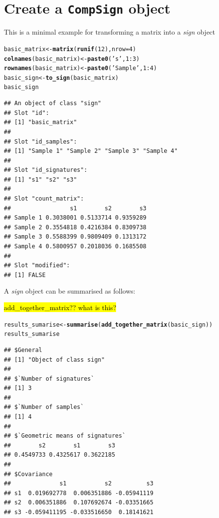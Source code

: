 \documentclass{article}\usepackage[]{graphicx}\usepackage[]{color}
\makeatletter
\newcommand{\hlnum}[1]{\textcolor[rgb]{0.686,0.059,0.569}{#1}}%
\newcommand{\hlstr}[1]{\textcolor[rgb]{0.192,0.494,0.8}{#1}}%
\newcommand{\hlopt}[1]{\textcolor[rgb]{0,0,0}{#1}}%
\newcommand{\hlstd}[1]{\textcolor[rgb]{0.345,0.345,0.345}{#1}}%
\newcommand{\hlkwb}[1]{\textcolor[rgb]{0.69,0.353,0.396}{#1}}%
\newcommand{\hlkwc}[1]{\textcolor[rgb]{0.333,0.667,0.333}{#1}}%
\newcommand{\hlkwd}[1]{\textcolor[rgb]{0.737,0.353,0.396}{\textbf{#1}}}%
\newenvironment{kframe}{%
 \def\at@end@of@kframe{}%
 \ifinner\ifhmode%
  \def\at@end@of@kframe{\end{minipage}}%
  \begin{minipage}{\columnwidth}%
 \fi\fi%
 \def\FrameCommand##1{\hskip\@totalleftmargin \hskip-\fboxsep
 \colorbox{shadecolor}{##1}\hskip-\fboxsep
     \hskip-\linewidth \hskip-\@totalleftmargin \hskip\columnwidth}%
 \MakeFramed {\advance\hsize-\width
   \@totalleftmargin\z@ \linewidth\hsize
   \@setminipage}}%
 {\par\unskip\endMakeFramed%
 \at@end@of@kframe}
\newenvironment{knitrout}{}{} %
\makeatother
\begin{document}
\section{Create a \texttt{CompSign} object}
This is a minimal example for transforming a matrix into a \emph{sign} object
\begin{knitrout}
\color{fgcolor}\begin{kframe}
\begin{alltt}
\hlstd{basic_matrix} \hlkwb{<-} \hlkwd{matrix}\hlstd{(}\hlkwd{runif}\hlstd{(}\hlnum{12}\hlstd{),} \hlkwc{nrow} \hlstd{=} \hlnum{4}\hlstd{)}
\hlkwd{colnames}\hlstd{(basic_matrix)} \hlkwb{<-} \hlkwd{paste0}\hlstd{(}\hlstr{'s'}\hlstd{,} \hlnum{1}\hlopt{:}\hlnum{3}\hlstd{)}
\hlkwd{rownames}\hlstd{(basic_matrix)} \hlkwb{<-} \hlkwd{paste0}\hlstd{(}\hlstr{'Sample '}\hlstd{,} \hlnum{1}\hlopt{:}\hlnum{4}\hlstd{)}
\hlstd{basic_sign} \hlkwb{<-} \hlkwd{to_sign}\hlstd{(basic_matrix)}
\hlstd{basic_sign}
\end{alltt}
\begin{verbatim}
## An object of class "sign"
## Slot "id":
## [1] "basic_matrix"
## 
## Slot "id_samples":
## [1] "Sample 1" "Sample 2" "Sample 3" "Sample 4"
## 
## Slot "id_signatures":
## [1] "s1" "s2" "s3"
## 
## Slot "count_matrix":
##                 s1        s2        s3
## Sample 1 0.3038001 0.5133714 0.9359289
## Sample 2 0.3554818 0.4216384 0.8309738
## Sample 3 0.5588399 0.9809409 0.1313172
## Sample 4 0.5800957 0.2018036 0.1685508
## 
## Slot "modified":
## [1] FALSE
\end{verbatim}
\end{kframe}
\end{knitrout}

A \emph{sign} object can be summarised as follows:

\hl{add\_together\_matrix?? what is this?}

\begin{knitrout}
\color{fgcolor}\begin{kframe}
\begin{alltt}
\hlstd{results_sumarise} \hlkwb{<-} \hlkwd{summarise}\hlstd{(}\hlkwd{add_together_matrix}\hlstd{(basic_sign))}
\hlstd{results_sumarise}
\end{alltt}
\begin{verbatim}
## $General
## [1] "Object of class sign"
## 
## $`Number of signatures`
## [1] 3
## 
## $`Number of samples`
## [1] 4
## 
## $`Geometric means of signatures`
##        s2        s1        s3 
## 0.4549733 0.4325617 0.3622185 
## 
## $Covariance
##              s1           s2          s3
## s1  0.019692778  0.006351886 -0.05941119
## s2  0.006351886  0.107692674 -0.03351665
## s3 -0.059411195 -0.033516650  0.18141621
\end{verbatim}
\end{kframe}
\end{knitrout}
\end{document}
